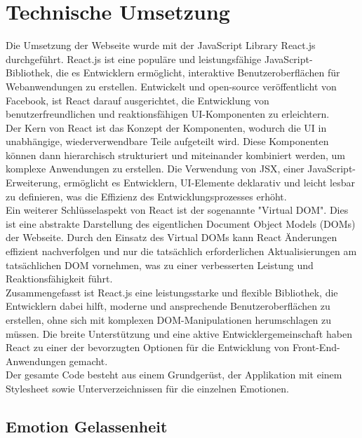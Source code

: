\documentclass[./dokumentation.tex]{subfiles}
\begin{document}
\chapter{Technische Umsetzung}
Die Umsetzung der Webseite wurde mit der JavaScript Library React.js durchgeführt.  React.js ist eine populäre und leistungsfähige JavaScript-Bibliothek, die es Entwicklern ermöglicht, interaktive Benutzeroberflächen für Webanwendungen zu erstellen. Entwickelt und open-source veröffentlicht von Facebook, ist React darauf ausgerichtet, die Entwicklung von benutzerfreundlichen und reaktionsfähigen UI-Komponenten zu erleichtern.\\

Der Kern von React ist das Konzept der Komponenten, wodurch die UI in unabhängige, wiederverwendbare Teile aufgeteilt wird. Diese Komponenten können dann hierarchisch strukturiert und miteinander kombiniert werden, um komplexe Anwendungen zu erstellen. Die Verwendung von JSX, einer JavaScript-Erweiterung, ermöglicht es Entwicklern, UI-Elemente deklarativ und leicht lesbar zu definieren, was die Effizienz des Entwicklungsprozesses erhöht.\\

Ein weiterer Schlüsselaspekt von React ist der sogenannte "Virtual DOM". Dies ist eine abstrakte Darstellung des eigentlichen Document Object Models (DOMs) der Webseite. Durch den Einsatz des Virtual DOMs kann React Änderungen effizient nachverfolgen und nur die tatsächlich erforderlichen Aktualisierungen am tatsächlichen DOM vornehmen, was zu einer verbesserten Leistung und Reaktionsfähigkeit führt.\\

Zusammengefasst ist React.js eine leistungsstarke und flexible Bibliothek, die Entwicklern dabei hilft, moderne und ansprechende Benutzeroberflächen zu erstellen, ohne sich mit komplexen DOM-Manipulationen herumschlagen zu müssen. Die breite Unterstützung und eine aktive Entwicklergemeinschaft haben React zu einer der bevorzugten Optionen für die Entwicklung von Front-End-Anwendungen gemacht.\\

Der gesamte Code besteht aus einem Grundgerüst, der Applikation mit einem Stylesheet sowie Unterverzeichnissen für die einzelnen Emotionen. 

\section{Emotion Gelassenheit}
\end{document}
